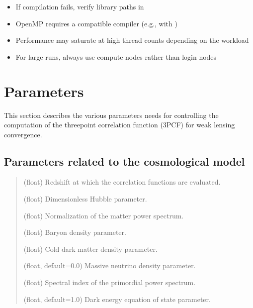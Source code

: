 \documentclass[letterpaper,10pt,english]{sphinxmanual}
\begin{document}
\sphinxAtStartPar
{}
\begin{itemize}
\item {} 
\sphinxAtStartPar
If compilation fails, verify library paths in 

\item {} 
\sphinxAtStartPar
OpenMP requires a compatible compiler (e.g.,  with )

\item {} 
\sphinxAtStartPar
Performance may saturate at high thread counts depending on the workload

\item {} 
\sphinxAtStartPar
For large runs, always use compute nodes rather than login nodes

\end{itemize}

\sphinxstepscope


\chapter{Parameters}
\label{\detokenize{params:parameters}}\label{\detokenize{params::doc}}
\sphinxAtStartPar
This section describes the various parameters  needs for controlling
the computation of the three\sphinxhyphen{}point correlation function (3PCF) for weak lensing convergence.


\section{Parameters related to the cosmological model}
\label{\detokenize{params:parameters-related-to-the-cosmological-model}}\begin{quote}\begin{description}
\sphinxAtStartPar
(float) Redshift at which the correlation functions are evaluated.

\sphinxAtStartPar
(float) Dimensionless Hubble parameter.

\sphinxAtStartPar
(float) Normalization of the matter power spectrum.

\sphinxAtStartPar
(float) Baryon density parameter.

\sphinxAtStartPar
(float) Cold dark matter density parameter.

\sphinxAtStartPar
(float, default=0.0) Massive neutrino density parameter.

\sphinxAtStartPar
(float) Spectral index of the primordial power spectrum.

\sphinxAtStartPar
(float, default=\sphinxhyphen{}1.0) Dark energy equation of state parameter.

\end{description}\end{quote}
\end{document}
